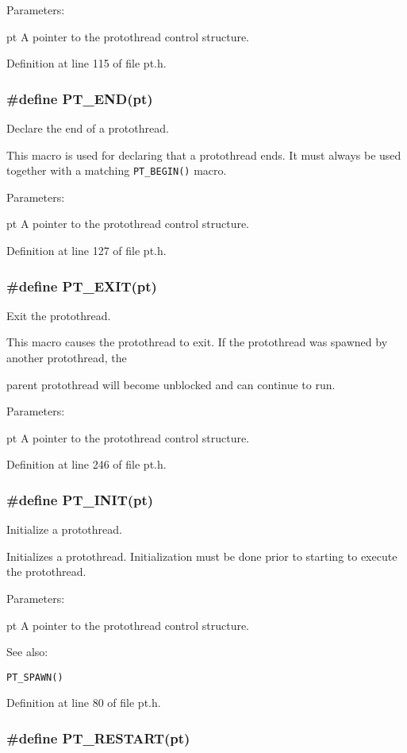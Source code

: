 \documentclass[12pt]{article}
\begin{document}
\begin{CJK}{UTF8}{bsmi}
Parameters:

pt A pointer to the protothread control structure.

Definition at line 115 of file pt.h.

\subsubsection{\#define PT\_{}END(pt)}

Declare the end of a protothread.

This macro is used for declaring that a protothread ends. It must always be used together with a matching \verb+PT_BEGIN()+ macro.

Parameters:

pt A pointer to the protothread control structure.

Definition at line 127 of file pt.h.

\subsubsection{\#define PT\_EXIT(pt)}

Exit the protothread.

This macro causes the protothread to exit. If the protothread was spawned by another protothread, the

parent protothread will become unblocked and can continue to run.

Parameters:

pt A pointer to the protothread control structure.

Definition at line 246 of file pt.h.

\subsubsection{\#define PT\_INIT(pt)}

Initialize a protothread.

Initializes a protothread. Initialization must be done prior to starting to execute the protothread.

Parameters:

pt A pointer to the protothread control structure.

See also:

\verb+PT_SPAWN()+

Definition at line 80 of file pt.h.

\subsubsection{\#define PT\_RESTART(pt)}


\end{CJK}
\end{document}
